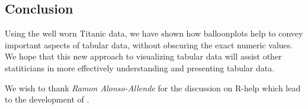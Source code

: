 \documentclass[a4paper]{report}
\begin{document}
\begin{article}
\section*{Conclusion}

Using the well worn Titanic data, we have shown how balloonplots
help to convey important aspects of tabular data, without obscuring
the exact numeric values. We hope that this new approach to
visualizing tabular data will assist other statiticians in more
effectively understanding and presenting tabular data.

We wish to thank \emph{Ramon Alonso-Allende}
 for the discussion on R-help which lead
to the development of .

\address{Gregory R. Warnes, Pfizer Inc., USA\\
\\
       Nitin Jain, Pfizer Inc., USA\\
}



\end{article}
\end{document}
